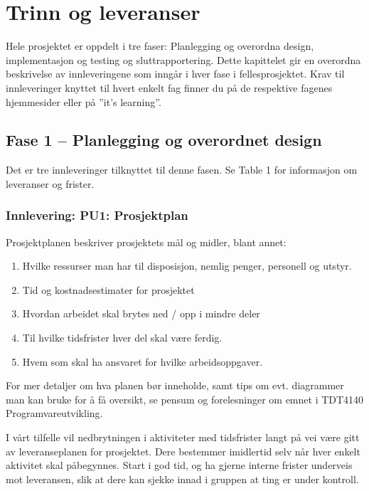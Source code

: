 \section{Trinn og leveranser}

Hele prosjektet er oppdelt i tre faser: Planlegging og overordna design, implementasjon og testing og sluttrapportering. Dette kapittelet gir en overordna beskrivelse av innleveringene som inngår i hver fase i fellesprosjektet. Krav til innleveringer knyttet til hvert enkelt fag finner du på de respektive fagenes hjemmesider eller på ”it’s learning”.

\subsection{Fase 1 – Planlegging og overordnet design}

Det er tre innleveringer tilknyttet til denne fasen. Se Table 1 for informasjon om leveranser og frister. 

\subsubsection{Innlevering: PU1: Prosjektplan}

Prosjektplanen beskriver prosjektets mål og midler, blant annet:

\begin{enumerate}

\item
Hvilke ressurser man har til disposisjon, nemlig penger, personell og utstyr.

\item
Tid og kostnadsestimater for prosjektet

\item
Hvordan arbeidet skal brytes ned / opp i mindre deler

\item
Til hvilke tidsfrister hver del skal være ferdig.

\item
Hvem som skal ha ansvaret for hvilke arbeidsoppgaver.

\end{enumerate}

For mer detaljer om hva planen bør inneholde, samt tips om evt. diagrammer man kan bruke for å få oversikt, se pensum og forelesninger om emnet i TDT4140 Programvareutvikling.

I vårt tilfelle vil nedbrytningen i aktiviteter med tidsfrister langt på vei være gitt av leveranseplanen for prosjektet. Dere bestemmer imidlertid selv når hver enkelt aktivitet skal påbegynnes. Start i god tid, og ha gjerne interne frister underveis mot leveransen, slik at dere kan sjekke innad i gruppen at ting er under kontroll.

